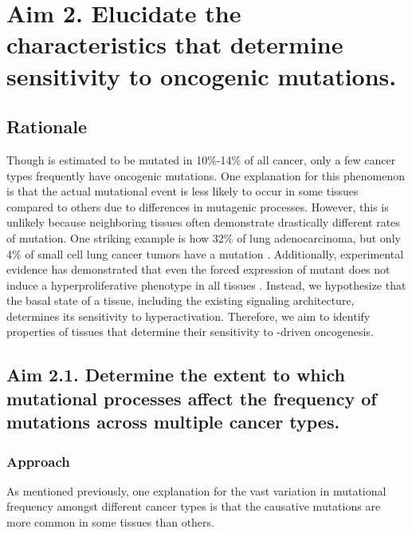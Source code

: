 \section{Aim 2. Elucidate the characteristics that determine sensitivity to oncogenic \KRAS{} mutations.}

\subsection*{Rationale}

Though \KRAS{} is estimated to be mutated in 10\%-14\% \cite{Bailey2018, Prior2020TheCancer} of all cancer, only a few cancer types frequently have oncogenic \KRAS{} mutations.
One explanation for this phenomenon is that the actual mutational event is less likely to occur in some tissues compared to others due to differences in mutagenic processes.
However, this is unlikely because neighboring tissues often demonstrate drastically different rates of \KRAS{} mutation.
One striking example is how 32\% of lung adenocarcinoma, but only 4\% of small cell lung cancer tumors have a \KRAS{} mutation \cite{Bailey2018, Prior2020TheCancer}.
Additionally, experimental evidence has demonstrated that even the forced expression of mutant \kras{} does not induce a hyperproliferative phenotype in all tissues \cite{Guerra2003TumorContext., Ray2011EpithelialModel,  Parikh2012MouseResponses}.
Instead, we hypothesize that the basal state of a tissue, including the existing signaling architecture, determines its sensitivity to \KRAS{} hyperactivation.
Therefore, we aim to identify properties of tissues that determine their sensitivity to \KRAS{}-driven oncogenesis.


\subsection*{Aim 2.1. Determine the extent to which mutational processes affect the frequency of \KRAS{} mutations across multiple cancer types.}

\subsubsection*{Approach}

As mentioned previously, one explanation for the vast variation in \KRAS{} mutational frequency amongst different cancer types is that the causative mutations are more common in some tissues than others.

